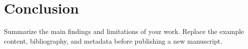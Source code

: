 \section{Conclusion}
Summarize the main findings and limitations of your work. Replace the example
content, bibliography, and metadata before publishing a new manuscript.

